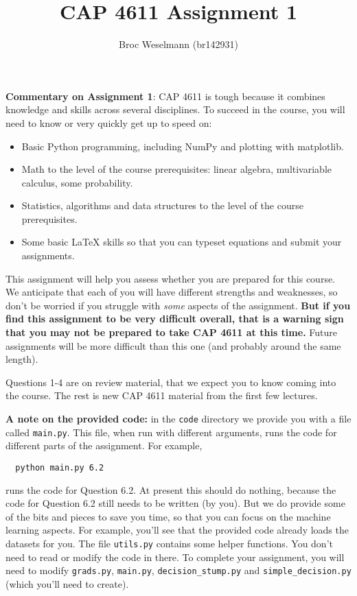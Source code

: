 \documentclass{article}
\begin{document}
  \title{CAP 4611 Assignment 1}

  \author{Broc Weselmann (br142931)}

  \date{}
  \maketitle

  \textbf{Commentary on Assignment 1}: CAP 4611 is tough because it combines knowledge and skills across several disciplines. To succeed
  in the course, you will need to know or very quickly get up to speed on:
  \begin{itemize}
  \item Basic Python programming, including NumPy and plotting with matplotlib.
  \item Math to the level of the course prerequisites: linear algebra, multivariable calculus, some probability.
  \item Statistics, algorithms and data structures to the level of the course prerequisites.
  \item Some basic LaTeX skills so that you can typeset equations and submit your assignments.
  \end{itemize}

  This assignment will help you assess whether you are prepared for this course. We anticipate that each
  of you will have different strengths and weaknesses, so don't be worried if you struggle with \emph{some} aspects
  of the assignment. \textbf{But if you find this assignment
  to be very difficult overall, that is a warning sign that you may not be prepared to take CAP 4611
  at this time.} Future assignments will be more difficult than this one (and probably around the same length).

  Questions 1-4 are on review material, that we expect you to know coming into the course. The rest is new CAP 4611 material from the first few lectures.

  \textbf{A note on the provided code:} in the \texttt{code} directory we provide you with a file called
  \texttt{main.py}. This file, when run with different arguments, runs the code for different
  parts of the assignment. For example,
  \begin{verbatim}
  python main.py 6.2
  \end{verbatim}
  runs the code for Question 6.2. At present this should do nothing, because the code
  for Question 6.2 still needs to be written (by you). But we do provide some of the bits
  and pieces to save you time, so that you can focus on the machine learning aspects.
  For example, you'll see that the provided code already loads the datasets for you.
  The file \texttt{utils.py} contains some helper functions.
  You don't need to read or modify the code in there.
  To complete your assignment, you will need to modify \texttt{grads.py}, \texttt{main.py}, \texttt{decision\string_stump.py} and \texttt{simple\string_decision.py} (which you'll need to create).
\end{document}
